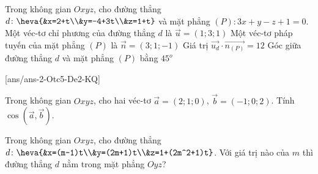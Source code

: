 \begin{ex}%
	Trong không gian $Oxyz$, cho đường thẳng $d\colon\heva{&x=2+t\\&y=-4+3t\\&z=1+t}$ và mặt phẳng $(P)\colon3x+y-z+1=0$.
	\choiceTF
	{\True Một véc-tơ chỉ phương của đường thẳng $d$ là $\vec{u}=(1;3;1)$}
	{\True Một véc-tơ pháp tuyến của mặt phẳng $(P)$ là $\vec{n}=(3;1;-1)$}
	{Giá trị $\vec{u_d}\cdot\vec{n_{(P)}}=12$}
	{Góc giữa đường thẳng $d$ và mặt phẳng $(P)$ bằng $45^o$}
\end{ex}



[ans/ans-2-Otc5-De2-KQ]
\caukq
\begin{ex}%
	Trong không gian $Oxyz$, cho hai véc-tơ $\overrightarrow{a}=(2;1;0)$, $\overrightarrow{b}=(-1;0;2)$. Tính $\cos(\overrightarrow{a},\overrightarrow{b})$.
\end{ex}
\begin{ex}%
	Trong không gian $Oxyz$, cho đường thẳng $d\colon\heva{&x=(m-1)t\\&y=(2m+1)t\\&z=1+(2m^2+1)t}$. Với giá trị nào của $m$ thì đường thẳng $d$ nằm trong mặt phẳng $Oyz$?
\end{ex}

